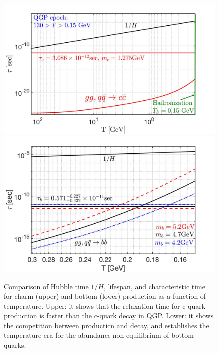 \documentclass[universe,article,submit,moreauthors,pdftex,a4paper]{Definitions/mdpi}
\begin{document}
\begin{figure} %
\begin{center}
\includegraphics[width=\textwidth]{./plots/CharmQuark_QGP.jpg}\\
\includegraphics[width=\textwidth]{./plots/BQuarkReactionTime_bottom.jpg}
\caption{ Comparison of Hubble time $1/H$, lifespan, and characteristic time for charm (upper) and bottom (lower) production as a function of temperature. Upper: it shows that the relaxation time for c-quark production is faster than the c-quark decay in QGP. Lower: it shows the competition between production and decay, and  establishes the temperature era for the abundance non-equilibrium of bottom quarks.}
\label{BCreaction_fig}
\end{center}
\end{figure}
\end{document}
